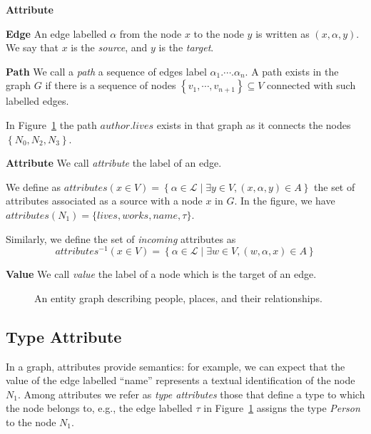 \begin{labeling}{\textbf{Attribute}}
	\item[\textbf{Edge}] An edge labelled $\alpha$ from the node $x$ to the node $y$ is written as $\left(x, \alpha, y\right)$. We say that $x$ is the \emph{source}, and $y$ is the \emph{target}.

	\item[\textbf{Path}] We call a \emph{path} a sequence of edges label $\alpha_1.\cdots.\alpha_n$. A path exists in the graph $G$ if there is a sequence of nodes $\left\lbrace v_1, \cdots, v_{n+1} \right\rbrace \subseteq V$ connected with such labelled edges.

	In Figure~\ref{fig:graph} the path $author.lives$ exists in that graph as it connects the nodes $\left\lbrace N_0, N_2, N_3 \right\rbrace$.

	\item[\textbf{Attribute}] We call \emph{attribute} the label of an edge.

		We define as $attributes\left(x \in V\right) = \left\lbrace \alpha \in \mathcal{L} \mid \exists y \in V, (x, \alpha, y) \in A \right\rbrace$ the set of attributes associated as a source with a node $x$ in $G$. In the figure, we have $attributes(N_1) = \{lives,works,name,\tau\}$.

	Similarly, we define the set of \emph{incoming} attributes as
	$$
	attributes^{-1}\left(x \in V\right) = \left\lbrace \alpha \in \mathcal{L} \mid \exists w \in V, (w, \alpha, x) \in A \right\rbrace
	$$
	\item[\textbf{Value}] We call \emph{value} the label of a node which is the target of an edge.
\end{labeling}

\begin{figure}
	\centering
	\resizebox{\textwidth}{!}{
		
	}
	\caption{An entity graph describing people, places, and their relationships.}
	\label{fig:graph}
\end{figure}

\subsection{Type Attribute}
\label{sec:ssd:type}

In a graph, attributes provide semantics: for example, we can expect that the value of the edge labelled ``name'' represents a textual identification of the node $N_1$. Among attributes we refer as \emph{type attributes} those that define a type to which the node belongs to, e.g., the edge labelled $\tau$ in Figure~\ref{fig:graph} assigns the type \emph{Person} to the node $N_1$.


